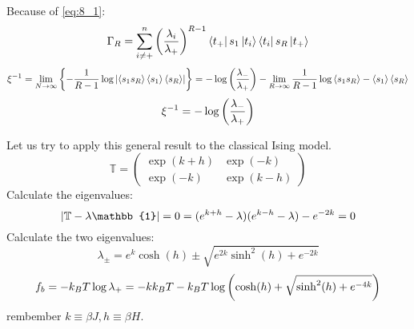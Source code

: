 \documentclass[../main/main.tex]{subfiles}
\begin{document}
Because of \eqref{eq:8_1}:
\begin{equation}
\Gamma _R =  \sum_{i \neq +}^{n} \qty(\frac{\lambda _i}{\lambda _+})^{R-1} \bra{t_+} s_1 \ket{t_i} \bra{t_i} s_R \ket{t_+}
\end{equation}
\begin{equation}
  \xi ^{-1} = \lim_{N \rightarrow \infty } \qty{-\frac{1}{R-1} \log{\qty|\expval{s_1s_R} \expval{s_1} \expval{s_R}   |} }  = -\log{\qty(\frac{\lambda _-}{\lambda _+}) } - \lim_{R \rightarrow \infty } \frac{1}{R-1} \log{\expval{s_1 s_R} - \expval{s_1}\expval{s_R}  }
\end{equation}
\begin{equation}
  \xi ^{-1} = - \log{\qty(\frac{\lambda _-}{\lambda_+}) }
\end{equation}

Let us try to apply this general result to the classical Ising model.
\begin{equation}
  \mathbb{T} =
  \begin{pmatrix}
  \exp (k+h)     & \exp (-k)  \\
  \exp (-k)    & \exp (k-h)
  \end{pmatrix}
\end{equation}
Calculate the eigenvalues:
\begin{equation}
  \abs{\mathbb{T}-\lambda \mathbb{1}} = 0 = (e^{k+h}- \lambda  )(e^{k-h}-\lambda  )-e^{-2k}=0
\end{equation}
Calculate the two eigenvalues:
\begin{equation}
  \lambda _{\pm} = e^{k} \cosh(h) \pm \sqrt{e^{2k}\sinh^2 (h)+e^{-2k} }
\end{equation}
\begin{equation}
  f_b = -k_B T \log{\lambda _+} = -k k_B T - k_B T \log{\qty( \cosh(h)+\sqrt{\sinh^2(h)+e^{-4k}  } )}
\end{equation}
rembember \( k \equiv \beta J, h \equiv \beta H\).
\end{document}
